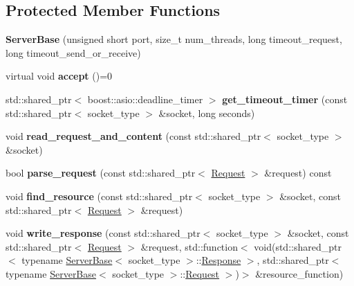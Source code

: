 \subsection*{Protected Member Functions}
\begin{DoxyCompactItemize}
\item 
\mbox{\label{classhttp_1_1_server_base_a29d14258f3e8863548793a50416a36af}} 
{\bfseries Server\+Base} (unsigned short port, size\+\_\+t num\+\_\+threads, long timeout\+\_\+request, long timeout\+\_\+send\+\_\+or\+\_\+receive)
\item 
\mbox{\label{classhttp_1_1_server_base_aa00dabdeb36dad9d15a07dc5bb30bb34}} 
virtual void {\bfseries accept} ()=0
\item 
\mbox{\label{classhttp_1_1_server_base_a34f54d33cbbe7a1bfefc11752b5aeb49}} 
std\+::shared\+\_\+ptr$<$ boost\+::asio\+::deadline\+\_\+timer $>$ {\bfseries get\+\_\+timeout\+\_\+timer} (const std\+::shared\+\_\+ptr$<$ socket\+\_\+type $>$ \&socket, long seconds)
\item 
\mbox{\label{classhttp_1_1_server_base_ae023912f61f873ee1a4bf952b96a6279}} 
void {\bfseries read\+\_\+request\+\_\+and\+\_\+content} (const std\+::shared\+\_\+ptr$<$ socket\+\_\+type $>$ \&socket)
\item 
\mbox{\label{classhttp_1_1_server_base_a6e3b9e402ff2c4f7f22aa64b951bdf67}} 
bool {\bfseries parse\+\_\+request} (const std\+::shared\+\_\+ptr$<$ \hyperlink{classhttp_1_1_server_base_1_1_request}{Request} $>$ \&request) const
\item 
\mbox{\label{classhttp_1_1_server_base_acff420b5de9a2ea2dd4b908229b02ed2}} 
void {\bfseries find\+\_\+resource} (const std\+::shared\+\_\+ptr$<$ socket\+\_\+type $>$ \&socket, const std\+::shared\+\_\+ptr$<$ \hyperlink{classhttp_1_1_server_base_1_1_request}{Request} $>$ \&request)
\item 
\mbox{\label{classhttp_1_1_server_base_a53a013e501552ecabbed0ad59b08f813}} 
void {\bfseries write\+\_\+response} (const std\+::shared\+\_\+ptr$<$ socket\+\_\+type $>$ \&socket, const std\+::shared\+\_\+ptr$<$ \hyperlink{classhttp_1_1_server_base_1_1_request}{Request} $>$ \&request, std\+::function$<$ void(std\+::shared\+\_\+ptr$<$ typename \hyperlink{classhttp_1_1_server_base}{Server\+Base}$<$ socket\+\_\+type $>$\+::\hyperlink{classhttp_1_1_server_base_1_1_response}{Response} $>$, std\+::shared\+\_\+ptr$<$ typename \hyperlink{classhttp_1_1_server_base}{Server\+Base}$<$ socket\+\_\+type $>$\+::\hyperlink{classhttp_1_1_server_base_1_1_request}{Request} $>$)$>$ \&resource\+\_\+function)

\end{DoxyCompactItemize}
